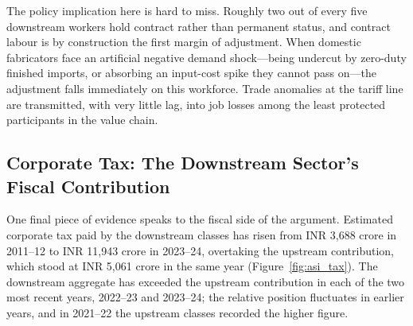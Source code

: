 \documentclass[11pt, a4paper]{article}
\numberwithin{figure}{section}
\numberwithin{table}{section}
\begin{document}
The policy implication here is hard to miss. Roughly two out of every five downstream workers hold contract rather than permanent status, and contract labour is by construction the first margin of adjustment. When domestic fabricators face an artificial negative demand shock---being undercut by zero-duty finished imports, or absorbing an input-cost spike they cannot pass on---the adjustment falls immediately on this workforce. Trade anomalies at the tariff line are transmitted, with very little lag, into job losses among the least protected participants in the value chain.

\subsection{Corporate Tax: The Downstream Sector's Fiscal Contribution}
One final piece of evidence speaks to the fiscal side of the argument. Estimated corporate tax paid by the downstream classes has risen from INR 3,688 crore in 2011--12 to INR 11,943 crore in 2023--24, overtaking the upstream contribution, which stood at INR 5,061 crore in the same year (Figure~\ref{fig:asi_tax}). The downstream aggregate has exceeded the upstream contribution in each of the two most recent years, 2022--23 and 2023--24; the relative position fluctuates in earlier years, and in 2021--22 the upstream classes recorded the higher figure.
\end{document}
